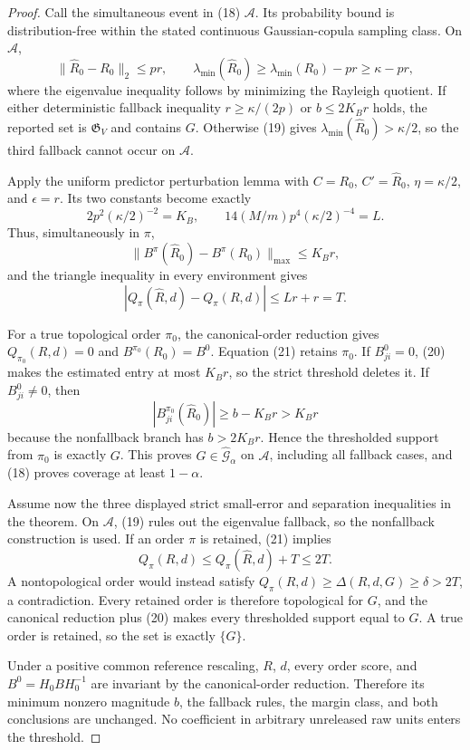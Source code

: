 \documentclass{article}
\begin{document}
\begin{proof}
Call the simultaneous event in (18) \(\mathcal A\).  Its probability bound is distribution-free within the stated continuous Gaussian-copula sampling class.  On \(\mathcal A\),
\[
 \|\widehat R_0-R_0\|_2\le p r,
 \qquad
 \lambda_{\min}(\widehat R_0)
 \ge\lambda_{\min}(R_0)-pr\ge\kappa-pr, \tag{19}
\]
where the eigenvalue inequality follows by minimizing the Rayleigh quotient.  If either deterministic fallback inequality \(r\ge\kappa/(2p)\) or \(b\le2K_Br\) holds, the reported set is \(\mathfrak G_V\) and contains \(G\).  Otherwise (19) gives
\(\lambda_{\min}(\widehat R_0)>\kappa/2\), so the third fallback cannot occur on \(\mathcal A\).

Apply the uniform predictor perturbation lemma with
\(C=R_0\), \(C'=\widehat R_0\), \(\eta=\kappa/2\), and \(\epsilon=r\).  Its two constants become exactly
\[
 2p^2(\kappa/2)^{-2}=K_B,
 \qquad
 14(M/m)p^4(\kappa/2)^{-4}=L.
\]
Thus, simultaneously in \(\pi\),
\[
 \|B^\pi(\widehat R_0)-B^\pi(R_0)\|_{\max}\le K_Br, \tag{20}
\]
and the triangle inequality in every environment gives
\[
 |Q_\pi(\widehat R,d)-Q_\pi(R,d)|
 \le Lr+r=T. \tag{21}
\]

For a true topological order \(\pi_0\), the canonical-order reduction gives
\(Q_{\pi_0}(R,d)=0\) and \(B^{\pi_0}(R_0)=B^0\).  Equation (21) retains \(\pi_0\).  If \(B^0_{ji}=0\), (20) makes the estimated entry at most \(K_Br\), so the strict threshold deletes it.  If \(B^0_{ji}\ne0\), then
\[
 |B^{\pi_0}_{ji}(\widehat R_0)|
 \ge b-K_Br>K_Br
\]
because the nonfallback branch has \(b>2K_Br\).  Hence the thresholded support from \(\pi_0\) is exactly \(G\).  This proves \(G\in\widehat{\mathcal G}_\alpha\) on \(\mathcal A\), including all fallback cases, and (18) proves coverage at least \(1-\alpha\).

Assume now the three displayed strict small-error and separation inequalities in the theorem.  On \(\mathcal A\), (19) rules out the eigenvalue fallback, so the nonfallback construction is used.  If an order \(\pi\) is retained, (21) implies
\[
 Q_\pi(R,d)\le Q_\pi(\widehat R,d)+T\le2T.
\]
A nontopological order would instead satisfy
\(Q_\pi(R,d)\ge\Delta(R,d,G)\ge\delta>2T\), a contradiction.  Every retained order is therefore topological for \(G\), and the canonical reduction plus (20) makes every thresholded support equal to \(G\).  A true order is retained, so the set is exactly \(\{G\}\).

Under a positive common reference rescaling, \(R\), \(d\), every order score, and \(B^0=H_0BH_0^{-1}\) are invariant by the canonical-order reduction.  Therefore its minimum nonzero magnitude \(b\), the fallback rules, the margin class, and both conclusions are unchanged.  No coefficient in arbitrary unreleased raw units enters the threshold.
\end{proof}
\end{document}
